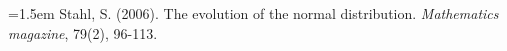 \documentclass{article}
\begin{document}
\noindent \hangindent=1.5em 
Stahl, S. (2006). The evolution of the normal distribution. \emph{Mathematics magazine}, 79(2), 96-113.


\begin{comment}

\appendix
\section{Generalization of De Moivre’s Approximation to Asymmetric Intervals}

We begin with De Moivre’s classical approximation for a symmetric binomial sum:

\begin{equation}
\sum_{|x-n/2| \leq d} {n \choose x} (1/2)^n \approx \frac{4}{\sqrt{2\pi}} \int_0^{d/\sqrt{n}} e^{-2y^2} dy.
\end{equation}

Our goal is to generalize this result to an asymmetric interval \( x \in [i, j] \) instead of the symmetric range \( |x - n/2| \leq d \), and then show how can we use the standard normal distribution to compute $\Pr(x\in[i,j])$.

\subsection*{Step 1: Reformulating the Summation Interval}

The original interval condition can be rewritten as:

\begin{equation}
x - n/2 \leq d \quad \text{or} \quad x - n/2 \geq -d.
\end{equation}

This corresponds to the symmetric interval:

\begin{equation}
x \in \left[ n/2 - d, n/2 + d \right] \cap \mathbb{N}.
\end{equation}

In other words, we can express (5) as:
\begin{equation}
\sum_{n/2 - d \leq x \leq n/2 + d   } {n \choose x} (1/2)^n \approx \frac{4}{\sqrt{2\pi}} \int_0^{d/\sqrt{n}} e^{-2y^2} dy.
\end{equation}


Now, instead of the symmetric case, we generalize to an asymmetric interval:

\begin{equation}
x \in [i, j],
\end{equation}


\end{comment}
\end{document}
